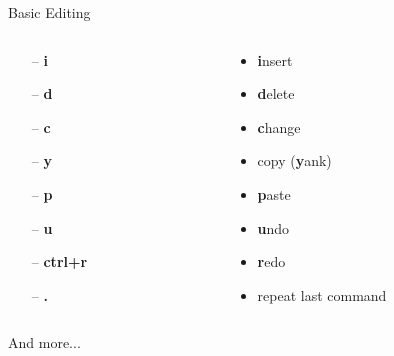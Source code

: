 \documentclass{beamer}
\begin{document}
\begin{frame}{Basic Editing}
    \begin{columns}
        \begin{column}{0.2\textwidth}
            \begin{itemize}
                \item[--] \textbf{i}
                \item[--] \textbf{d}
                \item[--] \textbf{c}
                \item[--] \textbf{y}
                \item[--] \textbf{p}
                \item[--] \textbf{u}
                \item[--] \textbf{ctrl+r}
                \item[--] \textbf{.}
            \end{itemize}
        \end{column}
        \begin{column}{0.8\textwidth}
            \begin{itemize}
                \item \textbf{i}nsert
                \item \textbf{d}elete
                \item \textbf{c}hange
                \item copy (\textbf{y}ank)
                \item \textbf{p}aste
                \item \textbf{u}ndo
                \item \textbf{r}edo
                \item repeat last command
            \end{itemize}
        \end{column}
    \end{columns}
    \begin{center}
        \large And more...
    \end{center}
\end{frame}
\end{document}
